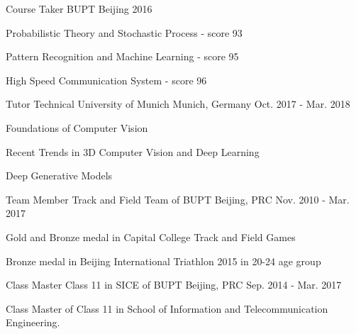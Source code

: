 


\begin{cventries}



\cventry
{Course Taker} %
{BUPT} %
{Beijing} %
{2016} %
{ %
\begin{cvitems}
\item {Probabilistic Theory and Stochastic Process - score 93}
\item {Pattern Recognition and Machine Learning - score 95}
\item {High Speed Communication System - score 96}
\end{cvitems}
}

\cventry
{Tutor} %
{Technical University of Munich} %
{Munich, Germany} %
{Oct. 2017 - Mar. 2018} %
{ %
\begin{cvitems}
\item {Foundations of Computer Vision}
\item {Recent Trends in 3D Computer Vision and Deep Learning}
\item {Deep Generative Models}
\end{cvitems}
}

\cventry
{Team Member} %
{Track and Field Team of BUPT} %
{Beijing, PRC} %
{Nov. 2010 - Mar. 2017} %
{ %
\begin{cvitems}
\item {Gold and Bronze medal in Capital College Track and Field Games}
\item {Bronze medal in Beijing International Triathlon 2015 in 20-24 age group}
\end{cvitems}
}

\cventry
{Class Master} %
{Class 11 in SICE of BUPT} %
{Beijing, PRC} %
{Sep. 2014 - Mar. 2017} %
{ %
\begin{cvitems}
\item {Class Master of Class 11 in School of Information and Telecommunication Engineering.}
\end{cvitems}
}


\end{cventries}
